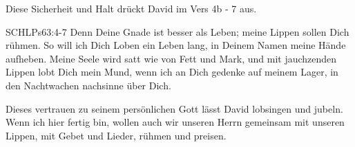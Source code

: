 \documentclass[fontsize=16pt]{mybib}
\begin{document}
    \begin{otsblock}
        Diese Sicherheit und Halt drückt David im Vers 4b - 7 aus.
        \begin{bibelbox}{SCHL}{Ps}{63:4-7}
            Denn Deine Gnade ist besser als Leben; meine Lippen sollen Dich rühmen. So will ich Dich Loben ein Leben lang, in Deinem Namen meine Hände aufheben. Meine Seele wird satt wie von Fett und Mark, und mit jauchzenden Lippen lobt Dich mein Mund, wenn ich an Dich gedenke auf meinem Lager, in den Nachtwachen nachsinne über Dich.
        \end{bibelbox}
        Dieses vertrauen zu seinem persönlichen Gott lässt David lobsingen und jubeln.
        Wenn ich hier fertig bin, wollen auch wir unseren Herrn gemeinsam mit unseren Lippen, mit Gebet und Lieder, rühmen und preisen.
    \end{otsblock}    
\end{document}
